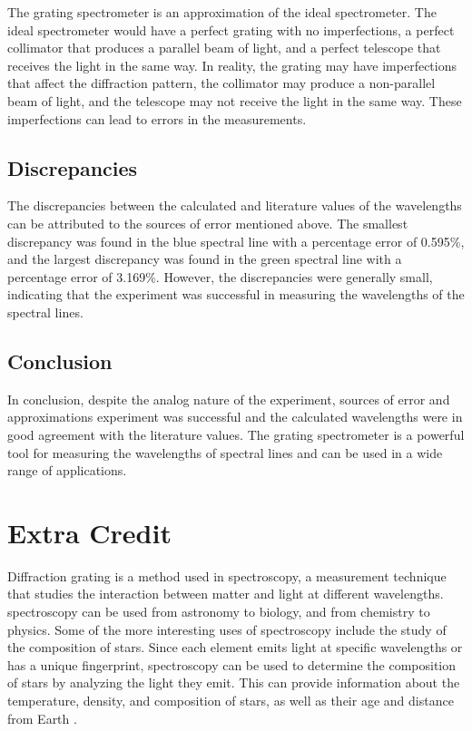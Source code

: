 \documentclass[10pt]{article}
\begin{document}
The grating spectrometer is an approximation of the ideal spectrometer. The ideal spectrometer would have a perfect grating with no imperfections, a perfect collimator that produces a parallel beam of light, and a perfect telescope that receives the light in the same way. In reality, the grating may have imperfections that affect the diffraction pattern, the collimator may produce a non-parallel beam of light, and the telescope may not receive the light in the same way. These imperfections can lead to errors in the measurements. 

\subsection*{Discrepancies}

The discrepancies between the calculated and literature values of the wavelengths can be attributed to the sources of error mentioned above. The smallest discrepancy was found in the blue spectral line with a percentage error of 0.595\%, and the largest discrepancy was found in the green spectral line with a percentage error of 3.169\%. However, the discrepancies were generally small, indicating that the experiment was successful in measuring the wavelengths of the spectral lines.

\subsection*{Conclusion}

In conclusion, despite the analog nature of the experiment, sources of error and approximations experiment was successful and the calculated wavelengths were in good agreement with the literature values. The grating spectrometer is a powerful tool for measuring the wavelengths of spectral lines and can be used in a wide range of applications.

\section{Extra Credit}

Diffraction grating is a method used in spectroscopy, a measurement technique that studies the interaction between matter and light at different wavelengths.  
spectroscopy can be used from astronomy to biology, and from chemistry to physics. Some of the more interesting uses of spectroscopy include the study of the composition of stars.
Since each element emits light at specific wavelengths or has a unique fingerprint, spectroscopy can be used to determine the composition of stars by analyzing the light they emit. This can provide information about the temperature, density, and composition of stars, as well as their age and distance from Earth \cite{Banerjee_2022}.

\printbibliography
\end{document}
